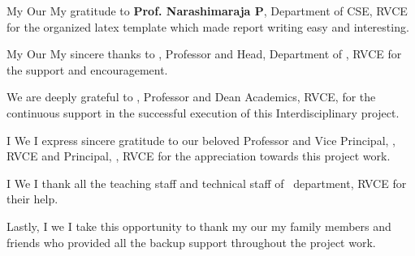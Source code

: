 \ifPG My \else \ifStuNameBUsed Our \else My \fi\fi gratitude to \textbf{Prof. Narashimaraja P}, Department of CSE, RVCE for the organized latex template which made report writing easy and interesting.\\ \par


\ifPG My \else \ifStuNameBUsed Our \else My \fi\fi sincere thanks to \textbf{\printHOD}, Professor and Head, Department of \ifIDP \printGuideDeptAInLF\else\printDepartmentLF\fi, RVCE for the support and encouragement.\\ \par

\ifIDP
We are deeply grateful to \textbf{\printDA}, Professor and Dean Academics, RVCE, for the continuous support in the successful execution of this Interdisciplinary project.
\\ \par
\fi
\ifPG I \else \ifStuNameBUsed We \else I \fi\fi express sincere gratitude to our beloved Professor and Vice Principal, \textbf{\printVicePrincipal}, RVCE and Principal, \textbf{\printPrincipal}, RVCE for the appreciation towards this project work.\\ \par

\ifIDP \else\ifPG I \else\ifStuNameBUsed We \else I \fi\fi thank all the teaching staff and technical staff of \ifIDP \printGuideDeptAInLF\else\printDepartmentLF\fi\, department, RVCE for their help.\\ \par \fi

Lastly, \ifPG I \else\ifStuNameBUsed we \else I \fi\fi take this opportunity to thank \ifPG my \else\ifStuNameBUsed our \else my \fi\fi family members and friends who provided all the backup support throughout the project work.\\ \par